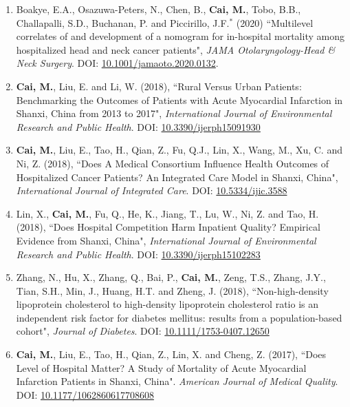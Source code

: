 \documentclass[11pt, a4paper]{article}
\newcommand{\years}[1]{\marginnote{\scriptsize #1}}
\begin{document}
\begin{enumerate}[leftmargin=0ex,itemsep=1ex]
		\item Boakye, E.A., Osazuwa-Peters, N., Chen, B., \textbf{Cai, M.}, Tobo, B.B., Challapalli, S.D., Buchanan, P. and Piccirillo, J.F.$^\ast$ (2020) ``Multilevel correlates of and development of a nomogram for in-hospital mortality among hospitalized head and neck cancer patients", \emph{JAMA Otolaryngology-Head \& Neck Surgery}. DOI: \href{https://doi.org/10.1001/jamaoto.2020.0132}{10.1001/jamaoto.2020.0132}.

		
		
		\item \years{2018}\textbf{Cai, M.}, Liu, E. and Li, W. (2018), ``Rural Versus Urban Patients: Benchmarking the Outcomes of Patients with Acute Myocardial Infarction in Shanxi, China from 2013 to 2017", \emph{International Journal of Environmental Research and Public Health}. DOI: \href{https://doi.org/10.3390/ijerph15091930}{10.3390/ijerph15091930}
		
		\item \textbf{Cai, M.}, Liu, E., Tao, H., Qian, Z., Fu, Q.J., Lin, X., Wang, M., Xu, C. and Ni, Z. (2018), ``Does A Medical Consortium Influence Health Outcomes of Hospitalized Cancer Patients? An Integrated Care Model in Shanxi, China", \emph{International Journal of Integrated Care}. DOI: \href{https://doi.org/10.5334/ijic.3588}{10.5334/ijic.3588}
		
		\item Lin, X., \textbf{Cai, M.}, Fu, Q., He, K., Jiang, T., Lu, W., Ni, Z. and Tao, H. (2018), ``Does Hospital Competition Harm Inpatient Quality? Empirical Evidence from Shanxi, China", \emph{International Journal of Environmental Research and Public Health}. DOI: \href{https://doi.org/10.3390/ijerph15102283}{10.3390/ijerph15102283}
		
		\item Zhang, N., Hu, X., Zhang, Q., Bai, P., \textbf{Cai, M.}, Zeng, T.S., Zhang, J.Y., Tian, S.H., Min, J., Huang, H.T. and Zheng, J. (2018), ``Non-high-density lipoprotein cholesterol to high-density lipoprotein cholesterol ratio is an independent risk factor for diabetes mellitus: results from a population-based cohort", \emph{Journal of Diabetes}. DOI: \href{https://doi.org/10.1111/1753-0407.12650}{10.1111/1753-0407.12650}
		
		
		\item \years{2017}\textbf{Cai, M.}, Liu, E., Tao, H., Qian, Z., Lin, X. and Cheng, Z. (2017), ``Does Level of Hospital Matter? A Study of Mortality of Acute Myocardial Infarction Patients in Shanxi, China". \emph{American Journal of Medical Quality}. DOI: \href{https://doi.org/10.1177/1062860617708608}{10.1177/1062860617708608}
		

\end{enumerate}
\end{document}
